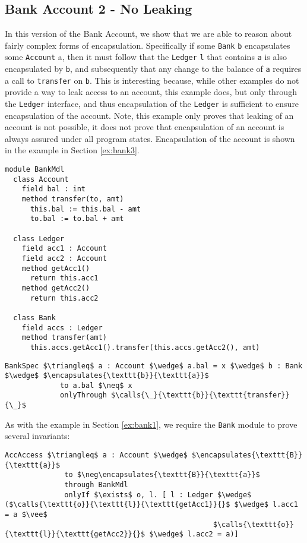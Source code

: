\documentclass[acmsmall,review,anonymous]{acmart}\settopmatter{printfolios=true,printccs=false,printacmref=false}
\begin{document}
\newpage

\subsection{Bank Account 2 - No Leaking} 
\label{ex:bank2}
In this version of the Bank Account, we show that we 
are able to reason about fairly complex forms of encapsulation.
Specifically if some \texttt{Bank} \texttt{b} encapsulates
some \texttt{Account} a, then it must follow that 
the \texttt{Ledger} \texttt{l} that contains \texttt{a}
is also encapsulated by \texttt{b}, and subsequently that any change to
the balance of \texttt{a} requires a call to \texttt{transfer}
on \texttt{b}. This is interesting because, while other examples
do not provide a way to leak access to an account, this example 
does, but only through the \texttt{Ledger} interface, and thus
encapsulation of the \texttt{Ledger} is sufficient to ensure
encapsulation of the account. Note, this example only proves 
that leaking of an account is not possible, it does not prove 
that encapsulation of an account is always assured under all 
program states. Encapsulation of the account is shown in the
example in Section \ref{ex:bank3}.
\begin{lstlisting}[mathescape=true, frame=lines]
module BankMdl
  class Account
    field bal : int
    method transfer(to, amt)
      this.bal := this.bal - amt
      to.bal := to.bal + amt

  class Ledger
    field acc1 : Account
    field acc2 : Account
    method getAcc1()
      return this.acc1
    method getAcc2()
      return this.acc2

  class Bank
    field accs : Ledger
    method transfer(amt)
      this.accs.getAcc1().transfer(this.accs.getAcc2(), amt)
\end{lstlisting}
\begin{lstlisting}[language = Chainmail, mathescape=true, frame=lines]
BankSpec $\triangleq$ a : Account $\wedge$ a.bal = x $\wedge$ b : Bank $\wedge$ $\encapsulates{\texttt{b}}{\texttt{a}}$
             to a.bal $\neq$ x
             onlyThrough $\calls{\_}{\texttt{b}}{\texttt{transfer}}{\_}$
\end{lstlisting}
As with the example in Section \ref{ex:bank1}, we require 
the \verb|Bank| module to prove several invariants:
\begin{lstlisting}[language = Chainmail, mathescape=true, frame=lines]
AccAccess $\triangleq$ a : Account $\wedge$ $\encapsulates{\texttt{B}}{\texttt{a}}$
              to $\neg\encapsulates{\texttt{B}}{\texttt{a}}$
              through BankMdl
              onlyIf $\exists$ o, l. [ l : Ledger $\wedge$ ($\calls{\texttt{o}}{\texttt{l}}{\texttt{getAcc1}}{}$ $\wedge$ l.acc1 = a $\vee$ 
                                                 $\calls{\texttt{o}}{\texttt{l}}{\texttt{getAcc2}}{}$ $\wedge$ l.acc2 = a)]
\end{lstlisting}
\end{document}
